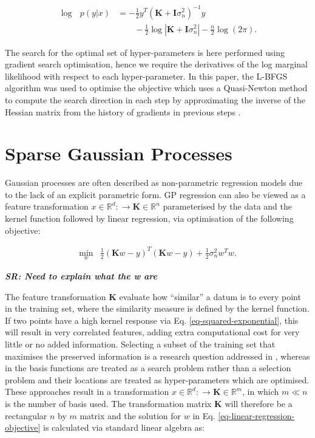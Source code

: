 \documentclass[useAMS,usenatbib,fleqn]{mn2e}
\newcommand{\bm}[1]{\mathbf{#1} }
\begin{document}
\begin{align}
\label{eq-log-marginal-likelihood}
\log\text{ }p(y|x) &= -\frac{1}{2}y^{T}\left(\bm{K}+\bm{I}\sigma_{n}^{2} \right)^{-1}y \nonumber \\
&\qquad -\frac{1}{2} \log\left | \bm{K}+\bm{I}\sigma_{n}^{2}\right|-\frac{n}{2}\log(2\pi).
\end{align}

The search for the optimal set of hyper-parameters is here performed using gradient search optimisation, hence we require the derivatives of the log marginal likelihood with respect to each hyper-parameter. In this paper, the L-BFGS algorithm was used to optimise the objective which uses a Quasi-Newton method to compute the search direction in each step by approximating the inverse of the Hessian matrix from the history of gradients in previous steps \citep{jorge1980}.

\section{Sparse Gaussian Processes}
\label{sec-sparse-gaussian-processes}
Gaussian processes are often described as non-parametric regression models due to the lack of an explicit parametric form. GP regression can also be viewed as a feature transformation $x\in \mathbb{R}^{d}:\rightarrow \bm{K}\in \mathbb{R}^{n}$ parameterised by the data and the kernel function followed by linear regression, via optimisation of the following objective:

\begin{equation}
\label{eq-linear-regression-objective}
\begin{array}{lcl}
\underset{w}{\text{min}} &\frac{1}{2}\left ( \bm{K}w-y \right )^{T}\left( \bm{K}w-y \right )+\frac{1}{2}\sigma_{n}^{2}w^{T}w.
\end{array}
\end{equation}

\emph{\textbf{SR: Need to explain what the w are}}

The feature transformation $\bm{K}$ evaluate how ``similar'' a datum is to every point in the training set, where the similarity measure is defined by the kernel function. If two points have a high kernel response via  Eq. \eqref{eq-squared-exponential}, this will result in very correlated features, adding extra computational cost for very little or no added information. Selecting a subset of the training set that maximises the preserved information is a research question addressed in \citep{foster2009}, whereas in \citep{snelson2005} the basis functions are treated as a search problem rather than a selection problem and their locations are treated as hyper-parameters which are optimised. These approaches result in a transformation $x\in \mathbb{R}^{d}:\rightarrow \bm{K}\in \mathbb{R}^{m}$, in which $m\ll n$ is the number of basis used. The transformation matrix $\bm{K}$ will therefore be a rectangular $n$ by $m$ matrix and the solution for $w$ in  Eq. \eqref{eq-linear-regression-objective} is calculated via standard linear algebra as:
\end{document}
